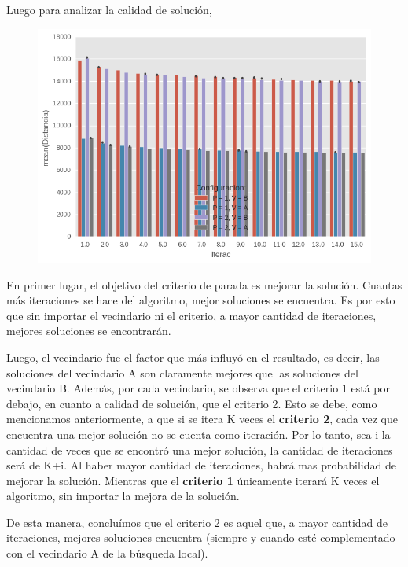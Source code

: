 \newpage
\par Luego para analizar la calidad de solución, 



\begin{figure}[H]
    \begin{center}
      \includegraphics[width=0.7\columnwidth]{imagenes/Ej4/ej4_exp2_Distancia.png}
    \end{center}
\end{figure}



En primer lugar, el objetivo del criterio de parada es mejorar la solución. Cuantas más iteraciones se hace del algoritmo, mejor soluciones se encuentra. Es por esto que sin importar el vecindario ni el criterio, a mayor cantidad de iteraciones, mejores soluciones se encontrarán. 
\par Luego, el vecindario fue el factor que más influyó en el resultado, es decir, las soluciones del vecindario A son claramente mejores que las soluciones del vecindario B. Además, por cada vecindario, se observa que el criterio 1 está por debajo, en cuanto a calidad de solución, que el criterio 2. Esto se debe, como mencionamos anteriormente, a que si se itera K veces el \textbf{criterio 2}, cada vez que encuentra una mejor solución no se cuenta como iteración. Por lo tanto, sea i la cantidad de veces que se encontró una mejor solución, la cantidad de iteraciones será de  K+i. Al haber mayor cantidad de iteraciones, habrá mas probabilidad de mejorar la solución. Mientras que el \textbf{criterio 1} únicamente iterará K veces el algoritmo, sin importar la mejora de la solución.
\par De esta manera, concluímos que el criterio 2 es aquel que, a mayor cantidad de iteraciones, mejores soluciones encuentra (siempre y cuando esté complementado con el vecindario A de la búsqueda local).

